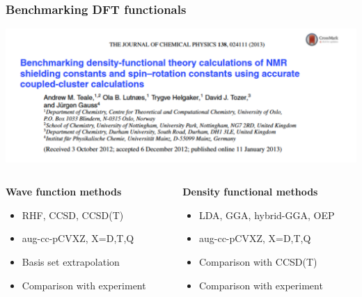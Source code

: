 \begin{frame}
\frametitle{Benchmarking DFT functionals}
\centering
\includegraphics[scale=0.35]{figures/Teale_etal_2013.pdf}

\vspace{10mm}

\begin{columns}
\begin{column}[b]{0.5\textwidth}
    \textbf{Wave function methods}
    \begin{itemize}
        \item   RHF, CCSD, CCSD(T)
        \item   aug-cc-pCVXZ, X=D,T,Q
        \item   Basis set extrapolation
        \item   Comparison with experiment
    \end{itemize}
\end{column}
\begin{column}[b]{0.5\textwidth}
    \textbf{Density functional methods}
    \begin{itemize}
        \item   LDA, GGA, hybrid-GGA, OEP
        \item   aug-cc-pCVXZ, X=D,T,Q
        \item   Comparison with CCSD(T)
        \item   Comparison with experiment
    \end{itemize}
\end{column}
\end{columns}
\end{frame}

